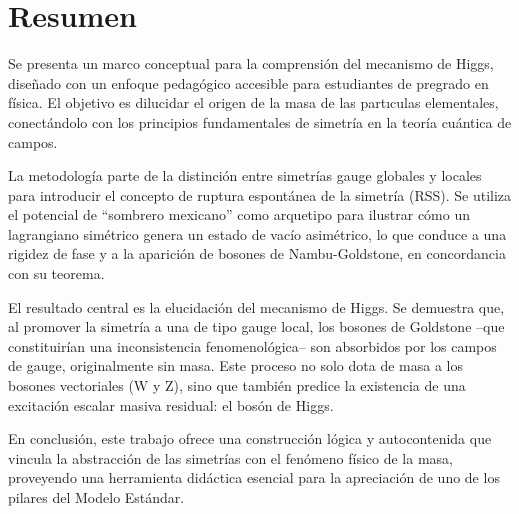 \section{Resumen}

Se presenta un marco conceptual para la comprensión del mecanismo de Higgs, diseñado con un enfoque pedagógico accesible para estudiantes de pregrado en física. El objetivo es dilucidar el origen de la masa de las partıculas elementales, conectándolo con los principios fundamentales de simetría en la teoría cuántica de campos.

La metodología parte de la distinción entre simetrías gauge globales y locales para introducir el concepto de ruptura espontánea de la simetría (RSS). Se utiliza el potencial de “sombrero mexicano” como arquetipo para ilustrar cómo un lagrangiano simétrico genera un estado de vacío asimétrico, lo que conduce a una rigidez de fase y a la aparición de bosones de Nambu-Goldstone, en concordancia con su teorema.

El resultado central es la elucidación del mecanismo de Higgs. Se demuestra que, al promover la simetría a una de tipo gauge local, los bosones de Goldstone –que constituirían una inconsistencia fenomenológica– son absorbidos por los campos de gauge, originalmente sin masa. Este proceso no solo dota de masa a los bosones vectoriales (W y Z), sino que también predice la existencia de una excitación escalar masiva residual: el bosón de Higgs.

En conclusión, este trabajo ofrece una construcción lógica y autocontenida que vincula la abstracción de las simetrías con el fenómeno físico de la masa, proveyendo una herramienta didáctica esencial para la apreciación de uno de los pilares del Modelo Estándar.
